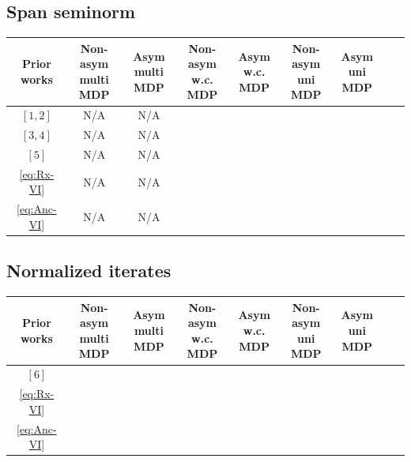 \documentclass{article} %
\newcommand{\cmark}{\ding{51}}%
\newcommand{\xmark}{\ding{55}}%
\begin{document}
\subsection{Span seminorm}

\begin{center}
\begin{tabular}{ |c|c|c|c|c|c|c|c|c| } 
 \hline
 Prior works & \makecell{Non-asym \\ multi MDP}& \makecell{Asym  \\ multi MDP}&  \makecell{Non-asym  \\ w.c. MDP}& \makecell{Asym  \\ w.c. MDP} &
  \makecell{Non-asym  \\ uni MDP}& \makecell{Asym  \\ uni MDP}  \\
  \hline 
  $[1,2]$  & N/A & N/A & \xmark & \xmark & \cmark &  \cmark \\
   $[3,4]$ & N/A & N/A & \xmark & \cmark & \cmark &  \cmark \\ 
    $[5]$& N/A & N/A & \xmark & \xmark & \cmark &  \cmark \\
  \hline
  \ref{eq:Rx-VI}  & N/A & N/A & \cmark & \cmark & \cmark &  \cmark \\
  \ref{eq:Anc-VI}  & N/A & N/A & \cmark & \cmark & \cmark &  \cmark \\
  \hline
\end{tabular}
\end{center}
\subsection{Normalized iterates}

\begin{center}
\begin{tabular}{ |c|c|c|c|c|c|c|c|c| } 
 \hline
 Prior works & \makecell{Non-asym \\ multi MDP}& \makecell{Asym  \\ multi MDP}&  \makecell{Non-asym  \\ w.c. MDP}& \makecell{Asym  \\ w.c. MDP} &
  \makecell{Non-asym  \\ uni MDP}& \makecell{Asym  \\ uni MDP}  \\
  \hline 
    $[6]$ & \cmark & \cmark & \cmark & \cmark & \cmark &  \cmark \\
  \hline
  \ref{eq:Rx-VI}  & \cmark & \cmark & \cmark & \cmark & \cmark &  \cmark \\
  \ref{eq:Anc-VI}  & \cmark & \cmark & \cmark & \cmark & \cmark &  \cmark \\
  \hline
\end{tabular}
\end{center}
\end{document}
